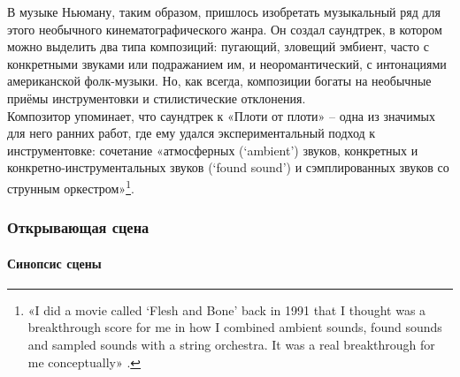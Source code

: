 В музыке Ньюману, таким образом, пришлось изобретать музыкальный ряд для этого необычного кинематографического жанра.
Он создал саундтрек, в котором можно выделить два типа композиций: пугающий, зловещий эмбиент, часто с конкретными звуками или подражанием им, и неоромантический, с интонациями американской фолк-музыки.
Но, как всегда, композиции богаты на необычные приёмы инструментовки и стилистические отклонения.\\
Композитор упоминает, что саундтрек к «Плоти от плоти» -- одна из значимых для него ранних работ, где ему удался экспериментальный подход к инструментовке: сочетание «атмосферных (`ambient') звуков, конкретных и конкретно-инструментальных звуков (`found sound') и сэмплированных звуков со струнным оркестром»\footnote{«I did a movie called `Flesh and Bone' back in 1991 that I thought was a breakthrough score for me in how I combined ambient sounds, found sounds and sampled sounds with a string orchestra. It was a real breakthrough for me conceptually» \autocite{TN.flesh.2012}.}.

\subsubsection{Открывающая сцена}\label{ux43eux442ux43aux440ux44bux432ux430ux44eux449ux430ux44f-ux441ux446ux435ux43dux430-1}

\paragraph{Синопсис сцены}\label{ux441ux438ux43dux43eux43fux441ux438ux441-ux441ux446ux435ux43dux44b-1}

